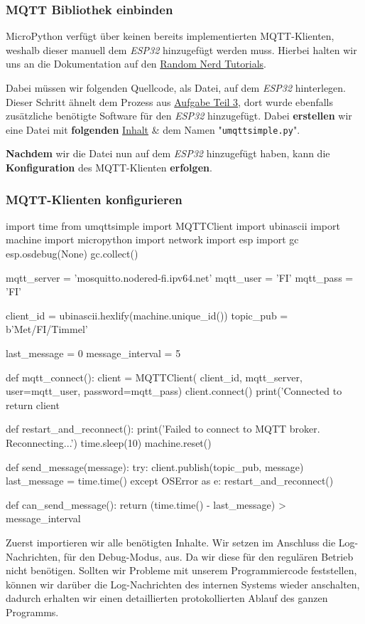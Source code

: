 \documentclass[18pt]{article}
\begin{document}
\subsubsection{MQTT Bibliothek einbinden}
MicroPython verfügt über keinen bereits implementierten MQTT-Klienten, weshalb dieser manuell dem \textit{ESP32} hinzugefügt werden muss. Hierbei halten wir uns an die Dokumentation auf den \hyperref{https://randomnerdtutorials.com/micropython-mqtt-esp32-esp8266/}{}{}{Random Nerd Tutorials}.

Dabei müssen wir folgenden Quellcode, als Datei, auf dem \textit{ESP32} hinterlegen. Dieser Schritt ähnelt dem Prozess aus \hyperref[sec:aufgabe3]{Aufgabe Teil 3}, dort wurde ebenfalls zusätzliche benötigte Software für den \textit{ESP32} hinzugefügt.
Dabei \textbf{erstellen} wir eine Datei mit \textbf{folgenden} \hyperref{https://raw.githubusercontent.com/RuiSantosdotme/ESP-MicroPython/master/code/MQTT/umqttsimple.py}{}{}{Inhalt}  \& dem Namen "\texttt{umqttsimple.py}".

\textbf{Nachdem} wir die Datei nun auf dem \textit{ESP32} hinzugefügt haben, kann die \textbf{Konfiguration} des MQTT-Klienten \textbf{erfolgen}.

\subsubsection{MQTT-Klienten konfigurieren}
\begin{python}
import time
from umqttsimple import MQTTClient
import ubinascii
import machine
import micropython
import network
import esp
import gc
esp.osdebug(None)
gc.collect()

mqtt_server = 'mosquitto.nodered-fi.ipv64.net'
mqtt_user = 'FI'
mqtt_pass = 'FI'

client_id = ubinascii.hexlify(machine.unique_id())
topic_pub = b'Met/FI/Timmel'

last_message = 0
message_interval = 5

def mqtt_connect():
	client = MQTTClient(
			client_id, 
			mqtt_server, 
			user=mqtt_user, 
			password=mqtt_pass)
	client.connect()
	print('Connected to %
	return client

def restart_and_reconnect():
	print('Failed to connect to MQTT broker. Reconnecting...')
	time.sleep(10)
	machine.reset()
	
def send_message(message):
	try:
		client.publish(topic_pub, message)
		last_message = time.time()
	except OSError as e:
		restart_and_reconnect()

def can_send_message():
	return (time.time() - last_message) > message_interval
\end{python}
Zuerst importieren wir alle benötigten Inhalte. Wir setzen im Anschluss die Log-Nachrichten, für den Debug-Modus, aus. Da wir diese für den regulären Betrieb nicht benötigen. Sollten wir Probleme mit unserem Programmiercode feststellen, können wir darüber die Log-Nachrichten des internen Systems wieder anschalten, dadurch erhalten wir einen detaillierten protokollierten Ablauf des ganzen Programms.
\end{document}
